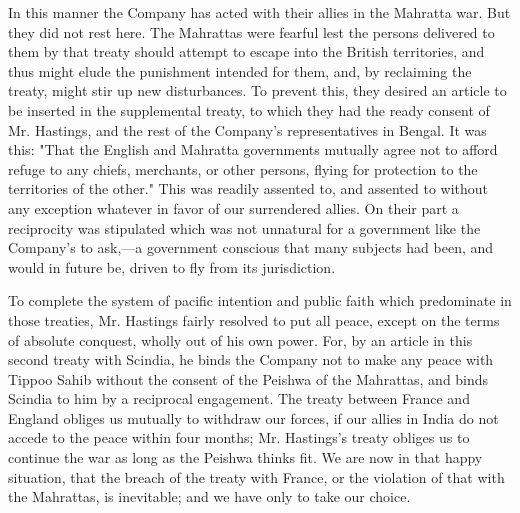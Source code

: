 In this manner the Company has acted with their allies in the Mahratta war. But they did not rest here. The Mahrattas were fearful lest the persons delivered to them by that treaty should attempt to escape into the British territories, and thus might elude the punishment intended for them, and, by reclaiming the treaty, might stir up new disturbances. To prevent this, they desired an article to be inserted in the supplemental treaty, to which they had the ready consent of Mr. Hastings, and the rest of the Company's representatives in Bengal. It was this: "That the English and Mahratta governments mutually agree not to afford refuge to any chiefs, merchants, or other persons, flying for protection to the territories of the other." This was readily assented to, and assented to without any exception whatever in favor of our surrendered allies. On their part a reciprocity was stipulated which was not unnatural for a government like the Company's to ask,—a government conscious that many subjects had been, and would in future be, driven to fly from its jurisdiction.

To complete the system of pacific intention and public faith which predominate in those treaties, Mr. Hastings fairly resolved to put all peace, except on the terms of absolute conquest, wholly out of his own power. For, by an article in this second treaty with Scindia, he binds the Company not to make any peace with Tippoo Sahib without the consent of the Peishwa of the Mahrattas, and binds Scindia to him by a reciprocal engagement. The treaty between France and England obliges us mutually to withdraw our forces, if our allies in India do not accede to the peace within four months; Mr. Hastings's treaty obliges us to continue the war as long as the Peishwa thinks fit. We are now in that happy situation, that the breach of the treaty with France, or the violation of that with the Mahrattas, is inevitable; and we have only to take our choice.

